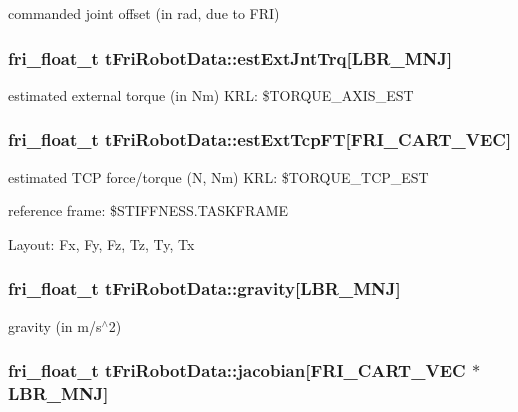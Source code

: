 commanded joint offset (in rad, due to \-F\-R\-I) \hypertarget{structtFriRobotData_aa2acaa7fa59afaf684164aaa57652e26}{
\subsubsection[{est\-Ext\-Jnt\-Trq}]{\setlength{\rightskip}{0pt plus 5cm}fri\-\_\-float\-\_\-t {\bf t\-Fri\-Robot\-Data\-::est\-Ext\-Jnt\-Trq}\mbox{[}{\bf \-L\-B\-R\-\_\-\-M\-N\-J}\mbox{]}}}\label{structtFriRobotData_aa2acaa7fa59afaf684164aaa57652e26}
estimated external torque (in \-Nm) \-K\-R\-L\-: \$\-T\-O\-R\-Q\-U\-E\-\_\-\-A\-X\-I\-S\-\_\-\-E\-S\-T \hypertarget{structtFriRobotData_a800976e07d320eb1e96c16b0247535a2}{
\subsubsection[{est\-Ext\-Tcp\-F\-T}]{\setlength{\rightskip}{0pt plus 5cm}fri\-\_\-float\-\_\-t {\bf t\-Fri\-Robot\-Data\-::est\-Ext\-Tcp\-F\-T}\mbox{[}{\bf \-F\-R\-I\-\_\-\-C\-A\-R\-T\-\_\-\-V\-E\-C}\mbox{]}}}\label{structtFriRobotData_a800976e07d320eb1e96c16b0247535a2}
estimated \-T\-C\-P force/torque (\-N, \-Nm) \-K\-R\-L\-: \$\-T\-O\-R\-Q\-U\-E\-\_\-\-T\-C\-P\-\_\-\-E\-S\-T
\begin{DoxyItemize}
\item reference frame\-: \$\-S\-T\-I\-F\-F\-N\-E\-S\-S.\-T\-A\-S\-K\-F\-R\-A\-M\-E
\item \-Layout\-: \-Fx, \-Fy, \-Fz, \-Tz, \-Ty, \-Tx 
\end{DoxyItemize}\hypertarget{structtFriRobotData_a5f379bf87bcedf36928c76f66f29450f}{
\subsubsection[{gravity}]{\setlength{\rightskip}{0pt plus 5cm}fri\-\_\-float\-\_\-t {\bf t\-Fri\-Robot\-Data\-::gravity}\mbox{[}{\bf \-L\-B\-R\-\_\-\-M\-N\-J}\mbox{]}}}\label{structtFriRobotData_a5f379bf87bcedf36928c76f66f29450f}
gravity (in m/s$^\wedge$2) \hypertarget{structtFriRobotData_ac8e9fe5c4f22e7bfbc4715ff952aea6e}{
\subsubsection[{jacobian}]{\setlength{\rightskip}{0pt plus 5cm}fri\-\_\-float\-\_\-t {\bf t\-Fri\-Robot\-Data\-::jacobian}\mbox{[}{\bf \-F\-R\-I\-\_\-\-C\-A\-R\-T\-\_\-\-V\-E\-C} $\ast${\bf \-L\-B\-R\-\_\-\-M\-N\-J}\mbox{]}}}\label{structtFriRobotData_ac8e9fe5c4f22e7bfbc4715ff952aea6e}
